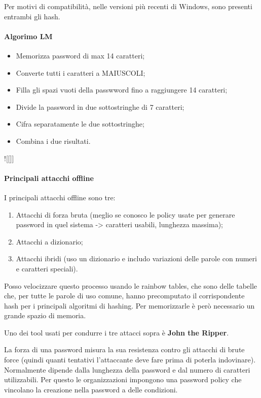 \noindent Per motivi di compatibilità, nelle versioni più recenti di Windows, sono presenti entrambi gli hash. 

\paragraph{Algorimo LM}
\begin{itemize}
    \item Memorizza password di max 14 caratteri;
    \item Converte tutti i caratteri a MAIUSCOLI;
    \item Filla gli spazi vuoti della passwword fino a raggiungere 14 caratteri;
    \item Divide la password in due sottostringhe di 7 caratteri;
    \item Cifra separatamente le due sottostringhe;
    \item Combina i due risultati.
\end{itemize}

 ![[]]

 \paragraph{Principali attacchi offline}
 I principali attacchi offline sono tre: 
 \begin{enumerate}
     \item Attacchi di forza bruta (meglio se conosco le policy usate per generare password in quel sistema -> caratteri usabili, lunghezza massima); 
     \item Attacchi a dizionario;
     \item Attacchi ibridi (uso un dizionario e includo variazioni delle parole con numeri e caratteri speciali).
 \end{enumerate}

\noindent Posso velocizzare questo processo usando le rainbow tables, che sono delle tabelle che, per tutte le parole di uso comune, hanno precomputato il corrispondente hash per i principali algoritmi di hashing. Per memorizzarle è però necessario un grande spazio di memoria. 

Uno dei tool usati per condurre i tre attacci sopra è \textbf{John the Ripper}.  

La forza di una password misura la sua resistenza contro gli attacchi di brute force (quindi quanti tentativi l'attaccante deve fare prima di poterla indovinare). Normalmente dipende dalla lunghezza della password e dal numero di caratteri utilizzabili. Per questo le organizzazioni impongono una password policy che vincolano la creazione nella password a delle condizioni. 

